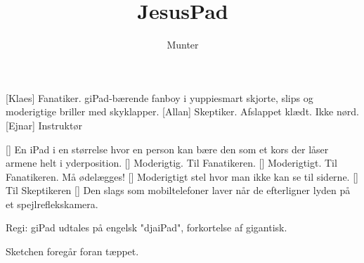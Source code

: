 \documentclass[a4paper,11pt]{article}
\title{JesusPad}
\author{Munter}
\begin{document}
\maketitle

\begin{roles}
	[Klaes] Fanatiker. giPad-bærende fanboy i yuppiesmart skjorte, slips og moderigtige briller med skyklapper.
	[Allan] Skeptiker. Afslappet klædt. Ikke nørd.
	[Ejnar] Instruktør
\end{roles}

\begin{props}
	 En iPad i en størrelse hvor en person kan bære den som et kors der låser armene helt i yderposition.
	 Moderigtig. Til Fanatikeren.
	 Moderigtigt. Til Fanatikeren. Må ødelægges!
	 Moderigtigt stel hvor man ikke kan se til siderne.
	 Til Skeptikeren
	 Den slags som mobiltelefoner laver når de efterligner lyden på et spejlreflekskamera.
\end{props}

\scene Regi: giPad udtales på engelsk "djaiPad", forkortelse af gigantisk.

\scene Sketchen foregår foran tæppet.
  
\end{document}
